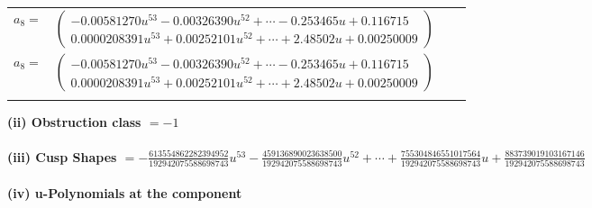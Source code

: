 \documentclass[1p]{elsarticle_modified}
\theoremstyle{definition}
\begin{document}
\begin{tabular}{m{7pt} m{180pt} m{7pt} m{180pt} }
\flushright $a_{8}=$&$\begin{pmatrix}-0.00581270 u^{53}-0.00326390 u^{52}+\cdots-0.253465 u+0.116715\\0.0000208391 u^{53}+0.00252101 u^{52}+\cdots+2.48502 u+0.00250009\end{pmatrix}$\\ \flushright $a_{8}=$&$\begin{pmatrix}-0.00581270 u^{53}-0.00326390 u^{52}+\cdots-0.253465 u+0.116715\\0.0000208391 u^{53}+0.00252101 u^{52}+\cdots+2.48502 u+0.00250009\end{pmatrix}$\\&\end{tabular}
\flushleft \textbf{(ii) Obstruction class $= -1$}\\~\\
\flushleft \textbf{(iii) Cusp Shapes $= -\frac{613554862282394952}{192942075588698743} u^{53}-\frac{459136890023638500}{192942075588698743} u^{52}+\cdots+\frac{755304846551017564}{192942075588698743} u+\frac{883739019103167146}{192942075588698743}$}\\~\\
\newpage\renewcommand{\arraystretch}{1}
\flushleft \textbf{(iv) u-Polynomials at the component}\newline \\
\end{document}
